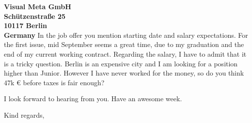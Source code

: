 \documentclass[a4paper]{willianpaixao-resume}
\begin{document}
\begin{letter}{\bfseries Visual Meta GmbH\\Schützenstraße 25\\10117 Berlin\\Germany}
In the job offer you mention starting date and salary expectations. For the
first issue, mid September seems a great time, due to my graduation and the end
of my current working contract. Regarding the salary, I have to admit that it is
a tricky question. Berlin is an expensive city and I am looking for a position
higher than Junior. However I have never worked for the money, so do you think
47k € before taxes is fair enough?

I look forward to hearing from you. Have an awesome week.
\closing{Kind regards,}
\end{letter}
\end{document}
